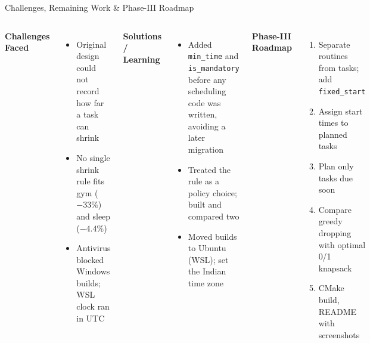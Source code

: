 \documentclass[aspectratio=169,11pt]{beamer}
\begin{document}
\begin{frame}{Challenges, Remaining Work \& Phase-III Roadmap}

\begin{columns}[T,totalwidth=\textwidth]


\textbf{\color{GEUBlue}Challenges Faced}

\begin{itemize}\itemsep2pt
\scriptsize
\item Original design could not record how far a task can shrink
\item No single shrink rule fits gym ($-33\%$) and sleep ($-4.4\%$)
\item Antivirus blocked Windows builds; WSL clock ran in UTC
\end{itemize}

\vspace{1mm}

\textbf{\color{GEUBlue}Solutions / Learning}

\begin{itemize}\itemsep
\scriptsize
\item Added \texttt{min\_time} and \texttt{is\_mandatory} before any scheduling
      code was written, avoiding a later migration
\item Treated the rule as a policy choice; built and compared two
\item Moved builds to Ubuntu (WSL); set the Indian time zone
\end{itemize}


\textbf{\color{GEUBlue}Phase-III Roadmap}

\begin{enumerate}\itemsep
\scriptsize
\item Separate routines from tasks; add \texttt{fixed\_start}
\item Assign start times to planned tasks
\item Plan only tasks due soon
\item Compare greedy dropping with optimal 0/1 knapsack
\item CMake build, README with screenshots
\end{enumerate}

\end{columns}

\vfill


\end{frame}
\end{document}
